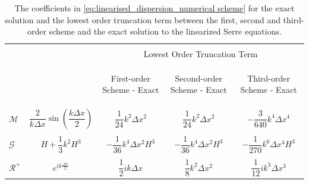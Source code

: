 \documentclass[preprint,sort&compress,1p]{article}
\begin{document}
\begin{landscape}
\begin{table}[t]
\caption{The coefficients in \eqref{eq:linearised_dispersion_numerical scheme} for the exact solution and the lowest order truncation term between the first, second and third-order scheme and the exact solution to the linearized Serre equations.}
\label{Table:The major differences in the derivation of the Serre and Shallow water wave equations}
\centering
{\footnotesize
\begin{tabular}{lcccc}
\hline
\phantom{p} & & & & \\
 & & \multicolumn{3}{c}{Lowest Order Truncation Term} \\
 \phantom{p} & & & & \\
 {\multirow{2}{*}{Variable}} & {\multirow{2}{*}{Exact}} & & & \\
\cline{3-5}
 \phantom{p} & & & & \\
&  & First-order Scheme - Exact & Second-order Scheme - Exact & Third-order  Scheme - Exact \\
\phantom{p} & & & & \\
\hline
\phantom{p} & & & & \\
\phantom{p} & & & & \\
$\mathcal{M}$                                                & $\dfrac{2}{k \Delta x} \sin \left( \dfrac{k \Delta x}{2} \right )$                        & $\dfrac{1}{24} k^2 \Delta x^2$                                                                             & $\dfrac{1}{24} k^2 \Delta x^2$ & $-\dfrac{3}{640} k^4 \Delta x^4$ \\
\phantom{p} & & & & \\
$\mathcal{G}$                                                & $H  + \dfrac{1}{3}k^2 H^3$                                             & $-\dfrac{1}{36}k^4 \Delta x^2 H^3$                                       & $-\dfrac{1}{36}k^4 \Delta x^2 H^3$                                    & $-\dfrac{1}{270}k^6 \Delta x^4 H^3$  \\
\phantom{p} & & & & \\
$\mathcal{R}^+$                                              & $e^{ i k \frac{\Delta x}{2}}$                            & $\dfrac{1}{2} ik \Delta x$                                               & $\dfrac{1}{8} k^2 \Delta x^2$                     & $\dfrac{1}{12} ik^3 \Delta x^3$ \\

\end{tabular}}
\end{table}
\end{landscape}
\end{document}
